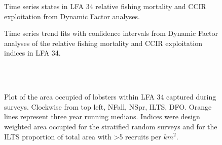 \documentclass[11pt]{article}
\newcommand{\e}{\string~/bio.data/bio.lobster/figures/LFA3438Framework2019/figures/} %
\begin{document}
   \begin{figure}
    \centering
        \caption{Time series states in LFA 34 relative fishing mortality and CCIR exploitation from Dynamic Factor analyses.}

    \end{figure}

\begin{figure}
    \centering
        \caption{Time series trend fits with confidence intervals from Dynamic Factor analyses of the relative fishing mortality and CCIR exploitation indices in LFA 34.}

    \end{figure}



    
\begin{figure}
        \centering
    \\
                \\
        
         \caption{Plot of the area occupied of lobsters within LFA 34 captured during surveys. Clockwise from top left, NFall, NSpr, ILTS, DFO.
         Orange lines represent three year running medians. Indices were design weighted area occupied for the stratified random surveys and for the ILTS proportion of total area with \textgreater 5 recruits per $km^2$.}
        \end{figure}

    
\end{document}

